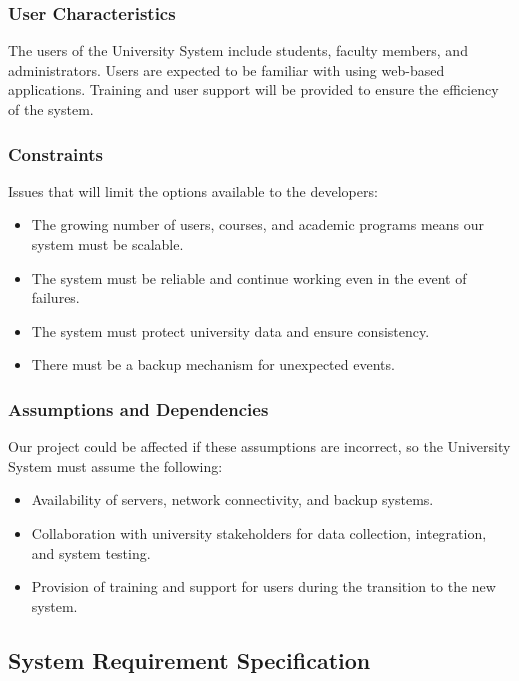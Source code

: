 \documentclass[12pt]{article}
\begin{document}
	\subsubsection{User Characteristics}
	The users of the University System include students, faculty members, and administrators. Users are expected to be familiar with using web-based applications. Training and user support will be provided to ensure the efficiency of the system.
	
	\subsubsection{Constraints}
	Issues that will limit the options available to the developers:
	\begin{itemize}
		\item The growing number of users, courses, and academic programs means our system must be scalable.
		\item The system must be reliable and continue working even in the event of failures.
		\item The system must protect university data and ensure consistency.
		\item There must be a backup mechanism for unexpected events.
	\end{itemize}
	
	\subsubsection{Assumptions and Dependencies}
	Our project could be affected if these assumptions are incorrect, so the University System must assume the following:
	\begin{itemize}
		\item Availability of servers, network connectivity, and backup systems.
		\item Collaboration with university stakeholders for data collection, integration, and system testing.
		\item Provision of training and support for users during the transition to the new system.
	\end{itemize}
	
	\subsection{System Requirement Specification}
	

	
		
\end{document}
